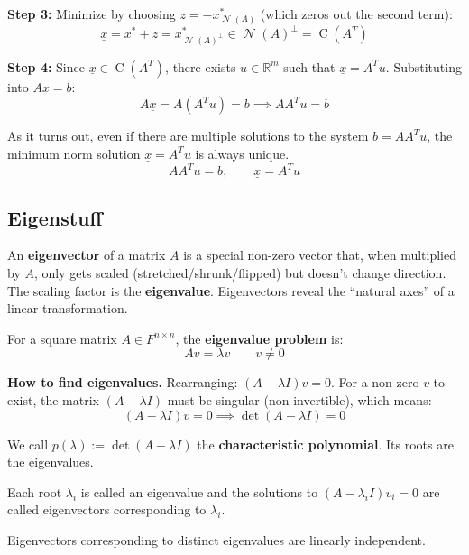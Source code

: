 \documentclass[11pt]{article}
\theoremstyle{definition}
\theoremstyle{plain}
\theoremstyle{remark}
\DeclareMathOperator{\Null}{\mathcal{N}}
\DeclareMathOperator{\Col}{C}
\begin{document}
\textbf{Step 3:} Minimize by choosing $z = -x^*_{\Null(A)}$ (which zeros out the second term):
\[
\underline{x} = x^* + z = x^*_{\Null(A)^\perp} \in \Null(A)^\perp = \Col(A^T)
\]

\textbf{Step 4:} Since $\underline{x} \in \Col(A^T)$, there exists $u \in \mathbb{R}^m$ such that $\underline{x} = A^T u$. Substituting into $Ax = b$:
\[
A\underline{x} = A(A^T u) = b \implies AA^T u = b
\]

As it turns out, even if there are multiple solutions to the system $b = AA^T u$, the minimum norm solution $\underline{x} = A^T u$ is always unique.
\[
\boxed{AA^T u = b, \qquad \underline{x} = A^T u}
\]

\subsection{Eigenstuff}

\begin{intuitionbox}
An \textbf{eigenvector} of a matrix $A$ is a special non-zero vector that, when multiplied by $A$, only gets scaled (stretched/shrunk/flipped) but doesn't change direction. The scaling factor is the \textbf{eigenvalue}. Eigenvectors reveal the ``natural axes'' of a linear transformation.
\end{intuitionbox}

For a square matrix $A \in F^{n \times n}$, the \textbf{eigenvalue problem} is:
\[
Av = \lambda v \qquad v \neq 0
\]

\textbf{How to find eigenvalues.} Rearranging: $(A - \lambda I)v = 0$. For a non-zero $v$ to exist, the matrix $(A - \lambda I)$ must be singular (non-invertible), which means:
\[
(A - \lambda I)v = 0 \implies \det(A - \lambda I) = 0
\]

We call $p(\lambda) := \det(A - \lambda I)$ the \textbf{characteristic polynomial}. Its roots are the eigenvalues.

Each root $\lambda_i$ is called an eigenvalue and the solutions to $(A - \lambda_i I)v_i = 0$ are called eigenvectors corresponding to $\lambda_i$.

Eigenvectors corresponding to distinct eigenvalues are linearly independent.
\end{document}
